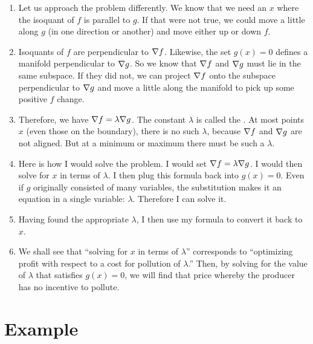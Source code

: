\documentclass[11pt, oneside]{amsart}
\begin{document}
\begin{enumerate}
  \item Let us approach the problem differently. We know that we need an
  $x$ where the isoquant of $f$ is parallel to $g$. If that were not
  true, we could move a little along $g$ (in one direction or another)
  and move either up or down $f$.

  \item Isoquants of $f$ are perpendicular to $\nabla f$. Likewise, the
  set $g(x)=0$ defines a manifold perpendicular to $\nabla g$. So we know
  that $\nabla f$ and $\nabla g$ must lie in the same subspace. If they
  did not, we can project $\nabla f$ onto the subspace perpendicular to
  $\nabla g$ and move a little along the manifold to pick up some
  positive $f$ change.

  \item Therefore, we have $\nabla f = \lambda \nabla g$. The constant
  $\lambda$ is called the . At most points
  $x$ (even those on the boundary), there is no such $\lambda$, because
  $\nabla f$ and $\nabla g$ are not aligned. But at a minimum or maximum
  there must be such a $\lambda$.

  \item Here is how I would solve the problem. I would set $\nabla f =
  \lambda \nabla g$. I would then solve for $x$ in terms of $\lambda$. I
  then plug this formula back into $g(x) = 0$. Even if $g$ originally
  consisted of many variables, the substitution makes it an equation in
  a single variable: $\lambda$. Therefore I can solve it.

  \item Having found the appropriate $\lambda$, I then use my formula to
  convert it back to $x$.

  \item We shall see that ``solving for $x$ in terms of $\lambda$''
  corresponds to ``optimizing profit with respect to a cost for
  pollution of $\lambda$.'' Then, by solving for the value of $\lambda$
  that satisfies $g(x) = 0$, we will find that price whereby the
  producer has no incentive to pollute.
\end{enumerate}

\section{Example}
\end{document}
